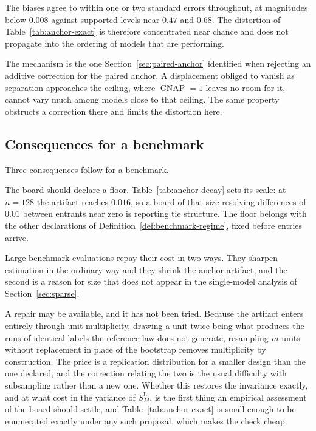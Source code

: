 \documentclass[11pt]{article}
\newcommand{\CNAP}{\operatorname{CNAP}}
\newcommand{\SLead}{S^{\mathrm{L}}}
\theoremstyle{remark}
\begin{document}
The biases agree to within one or two standard errors throughout, at magnitudes below $0.008$ against supported levels near $0.47$ and $0.68$. The distortion of Table~\ref{tab:anchor-exact} is therefore concentrated near chance and does not propagate into the ordering of models that are performing.

The mechanism is the one Section~\ref{sec:paired-anchor} identified when rejecting an additive correction for the paired anchor. A displacement obliged to vanish as separation approaches the ceiling, where $\CNAP=1$ leaves no room for it, cannot vary much among models close to that ceiling. The same property obstructs a correction there and limits the distortion here.

\subsection{Consequences for a benchmark}

Three consequences follow for a benchmark.

The board should declare a floor. Table~\ref{tab:anchor-decay} sets its scale: at $n=128$ the artifact reaches $0.016$, so a board of that size resolving differences of $0.01$ between entrants near zero is reporting tie structure. The floor belongs with the other declarations of Definition~\ref{def:benchmark-regime}, fixed before entries arrive.

Large benchmark evaluations repay their cost in two ways. They sharpen estimation in the ordinary way and they shrink the anchor artifact, and the second is a reason for size that does not appear in the single-model analysis of Section~\ref{sec:sparse}.

A repair may be available, and it has not been tried. Because the artifact enters entirely through unit multiplicity, drawing a unit twice being what produces the runs of identical labels the reference law does not generate, resampling $m$ units without replacement in place of the bootstrap removes multiplicity by construction. The price is a replication distribution for a smaller design than the one declared, and the correction relating the two is the usual difficulty with subsampling rather than a new one. Whether this restores the invariance exactly, and at what cost in the variance of $\SLead_M$, is the first thing an empirical assessment of the board should settle, and Table~\ref{tab:anchor-exact} is small enough to be enumerated exactly under any such proposal, which makes the check cheap.
\end{document}
